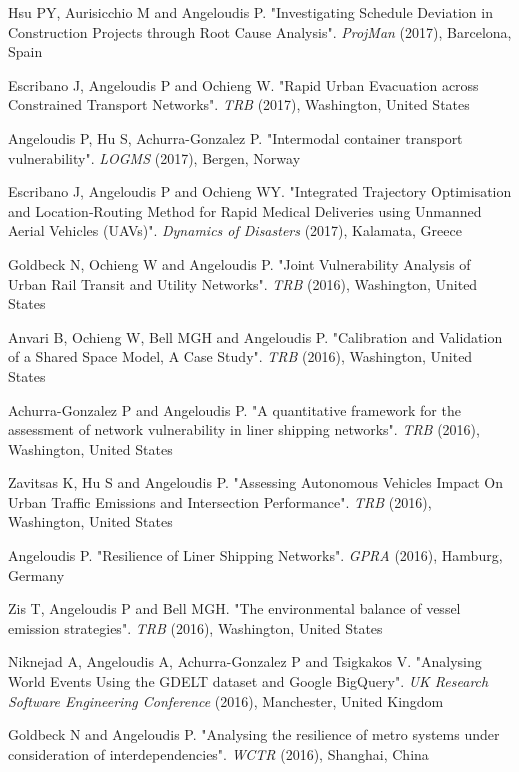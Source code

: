 \documentclass[margin]{res}
\begin{document}
\begin{resume}
\begin{etaremune}
	\item
	{Hsu PY, Aurisicchio M and Angeloudis P}. "{Investigating Schedule Deviation in Construction Projects through Root Cause Analysis}". \textit{ProjMan} (2017), Barcelona, Spain
	\item
	{Escribano J, Angeloudis P and Ochieng W}. "{Rapid Urban Evacuation across Constrained Transport Networks}". \textit{TRB} (2017), Washington, United States
	\item
	{Angeloudis P, Hu S, Achurra-Gonzalez P}. "{Intermodal container transport vulnerability}". \textit{LOGMS} (2017), Bergen, Norway
	\item
	{Escribano J, Angeloudis P and Ochieng WY}. "{Integrated Trajectory Optimisation and Location‐Routing Method for Rapid Medical Deliveries using Unmanned Aerial Vehicles (UAVs)}". \textit{Dynamics of Disasters} (2017), Kalamata, Greece
	\item
	{Goldbeck N, Ochieng W and Angeloudis P}. "{Joint Vulnerability Analysis of Urban Rail Transit and Utility Networks}". \textit{TRB} (2016), Washington, United States
	\item
	{Anvari B, Ochieng W, Bell MGH and Angeloudis P}. "{Calibration and Validation of a Shared Space Model, A Case Study}". \textit{TRB} (2016), Washington, United States
	\item
	{Achurra-Gonzalez P and Angeloudis P}. "{A quantitative framework for the assessment of network vulnerability in liner shipping networks}". \textit{TRB} (2016), Washington, United States
	\item
	{Zavitsas K, Hu S and Angeloudis P}. "{Assessing Autonomous Vehicles Impact On Urban Traffic Emissions and Intersection Performance}". \textit{TRB} (2016), Washington, United States
	\item
	{Angeloudis P}. "{Resilience of Liner Shipping Networks}". \textit{GPRA} (2016), Hamburg, Germany
	\item
	{Zis T, Angeloudis P and Bell MGH}. "{The environmental balance of vessel emission strategies}". \textit{TRB} (2016), Washington, United States
	\item
	{Niknejad A, Angeloudis A, Achurra-Gonzalez  P and Tsigkakos V}. "{Analysing World Events Using the GDELT dataset and Google BigQuery}". \textit{UK Research Software Engineering Conference} (2016), Manchester, United Kingdom
	\item
	{Goldbeck N and Angeloudis P}. "{Analysing the resilience of metro systems under consideration of interdependencies}". \textit{WCTR} (2016), Shanghai, China
	\item

\end{etaremune}
\end{resume}
\end{document}
